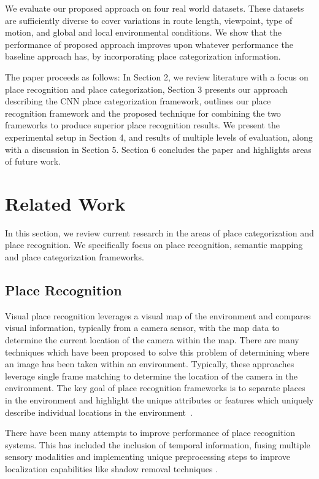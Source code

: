 \documentclass[letterpaper, 10 pt, conference]{ieeeconf}  %
\begin{document}
We evaluate our proposed approach on four real world datasets. These datasets are sufficiently diverse to cover variations in route length, viewpoint, type of motion, and global and local environmental conditions. We show that the performance of proposed approach improves upon whatever performance the baseline approach has, by incorporating place categorization information. 

The paper proceeds as follows: In Section 2, we review literature with a focus on place recognition and place categorization, Section 3 presents our approach describing the CNN place categorization framework, outlines our place recognition framework and the proposed technique for combining the two frameworks to produce superior place recognition results. We present the experimental setup in Section 4, and results of multiple levels of evaluation, along with a discussion in Section 5. Section 6 concludes the paper and highlights areas of future work.

\section{Related Work}
In this section, we review current research in the areas of place categorization and place recognition. We specifically focus on place recognition, semantic mapping and place categorization frameworks. 

\subsection{Place Recognition}
Visual place recognition leverages a visual map of the environment and compares visual information, typically from a camera sensor, with the map data to determine the current location of the camera within the map. There are many techniques which have been proposed to solve this problem of determining where an image has been taken within an environment. Typically, these approaches leverage single frame matching to determine the location of the camera in the environment. The key goal of place recognition frameworks is to separate places in the environment and highlight the unique attributes or features which uniquely describe individual locations in the environment~\cite{Cummins2009}. 

There have been many attempts to improve performance of place recognition systems. This has included the inclusion of temporal information, fusing multiple sensory modalities and implementing unique preprocessing steps to improve localization capabilities like shadow removal techniques \cite{corke2013dealing}. 
\end{document}
